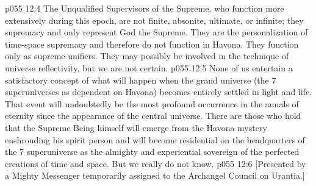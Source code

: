 \vs p055 12:4 The Unqualified Supervisors of the Supreme, who function more extensively during this epoch, are not finite, absonite, ultimate, or infinite; they  supremacy and only represent God the Supreme. They are the personalization of time\hyp{}space supremacy and therefore do not function in Havona. They function only as supreme unifiers. They may possibly be involved in the technique of universe reflectivity, but we are not certain.
\vs p055 12:5 \pc None of us entertain a satisfactory concept of what will happen when the grand universe (the 7 superuniverses as dependent on Havona) becomes entirely settled in light and life. That event will undoubtedly be the most profound occurrence in the annals of eternity since the appearance of the central universe. There are those who hold that the Supreme Being himself will emerge from the Havona mystery enshrouding his spirit person and will become residential on the headquarters of the 7 superuniverse as the almighty and experiential sovereign of the perfected creations of time and space. But we really do not know.
\vsetoff
\vs p055 12:6 [Presented by a Mighty Messenger temporarily assigned to the Archangel Council on Urantia.]
\quizlink
